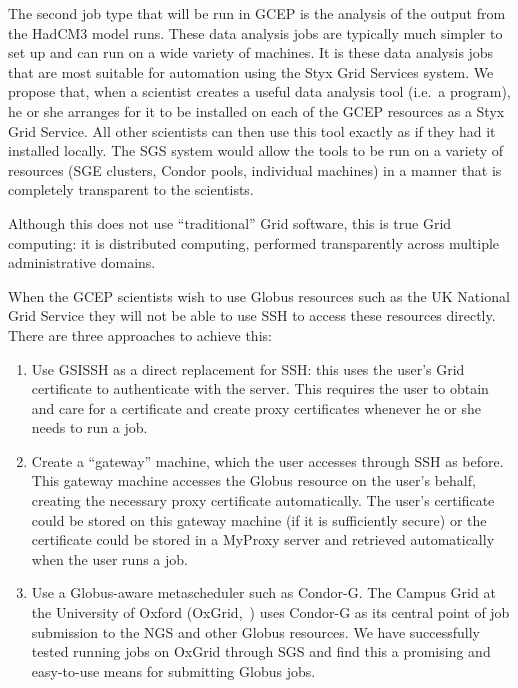 \documentclass[times,10pt,twocolumn,8.5x11]{article}
\begin{document}
The second job type that will be run in GCEP is the analysis of the output from the HadCM3 model runs.  These data analysis jobs are typically much simpler to set up and can run on a wide variety of machines.  It is these data analysis jobs that are most suitable for automation using the Styx Grid Services system.  We propose that, when a scientist creates a useful data analysis tool (i.e.\ a program), he or she arranges for it to be installed on each of the GCEP resources as a Styx Grid Service.  All other scientists can then use this tool exactly as if they had it installed locally.  The SGS system would allow the tools to be run on a variety of resources (SGE clusters, Condor pools, individual machines) in a manner that is completely transparent to the scientists.

Although this does not use ``traditional'' Grid software, this is true Grid computing: it is distributed computing, performed transparently across multiple administrative domains.

When the GCEP scientists wish to use Globus resources such as the UK National Grid Service they will not be able to use SSH to access these resources directly.  There are three approaches to achieve this:

\begin{enumerate}
\item Use GSISSH as a direct replacement for SSH: this uses the user's Grid certificate to authenticate with the server.  This requires the user to obtain and care for a certificate and create proxy certificates whenever he or she needs to run a job.
\item Create a ``gateway'' machine, which the user accesses through SSH as before. This gateway machine accesses the Globus resource on the user's behalf, creating the necessary proxy certificate automatically.  The user's certificate could be stored on this gateway machine (if it is sufficiently secure) or the certificate could be stored in a MyProxy server and retrieved automatically when the user runs a job.
\item Use a Globus-aware metascheduler such as Condor-G.  The Campus Grid at the University of Oxford (OxGrid,~\cite{wallom:2006}) uses Condor-G as its central point of job submission to the NGS and other Globus resources.  We have successfully tested running jobs on OxGrid through SGS and find this a promising and easy-to-use means for submitting Globus jobs.
\end{enumerate}
\end{document}
